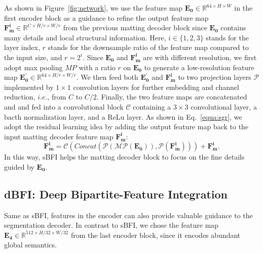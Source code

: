 \documentclass[sigconf]{acmart}
\begin{document}
As shown in Figure~\ref{fig:network}, we use the feature map $\mathbf{E_0}\in \mathbb{R}^{64\times H \times W}$ in the first encoder block as a guidance to refine the output feature map $\mathbf{F_m^i}\in\mathbb{R}^{C\times H/r \times W/r}$ from the previous matting decoder block since $\mathbf{E_0}$ contains many details and local structural information. Here, $i\in \{1,2,3\}$ stands for the layer index, $r$ stands for the downsample ratio of the feature map compared to the input size, and $r=2^i$. Since $\mathbf{E_0}$ and $\mathbf{F_m^i}$ are with different resolution, we first adopt max pooling $MP$ with a ratio $r$ on $\mathbf{E_0}$ to generate a low-resolution feature map $\mathbf{E_0^{'}}\in \mathbb{R}^{64\times H/r \times W/r}$. We then feed both $\mathbf{E_0^{'}}$ and $\mathbf{F_m^i}$ to two projection layers $\mathcal{P}$ implemented by $1\times1$ convolution layers for further embedding and channel reduction, $i.e.$, from $C$ to $C/2$. Finally, the two feature maps are concatenated and and fed into a convolutional block $\mathcal{C}$ containing a $3\times3$ convolutional layer, a bacth normalization layer, and a ReLu layer. As shown in Eq.~\ref{equa:sgr}, we adopt the residual learning idea by adding the output feature map back to the input matting decoder feature map $\mathbf{F_m^i}$:
\begin{equation}
\mathbf{F_m^i} = \mathcal{C}(Concat(\mathcal{P}(\mathcal{MP}(\mathbf{E_0})),\mathcal{P}(\mathbf{F^i_m})))+\mathbf{F_m^i}.
\label{equa:sgr}
\end{equation}
In this way, sBFI helps the matting decoder block to focus on the fine details guided by $\mathbf{E_0}$.

\subsection{dBFI: Deep Bipartite-Feature Integration}
Same as sBFI, features in the encoder can also provide valuable guidance to the segmentation decoder. In contrast to sBFI, we chose the feature map $\mathbf{E_4}\in \mathbb{R}^{512\times H/32 \times W/32}$ from the last encoder block, since it encodes abundant global semantics. 
\end{document}
